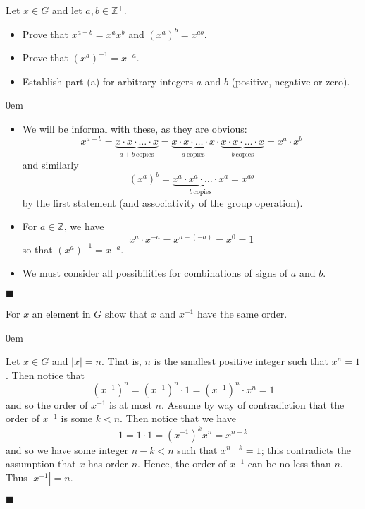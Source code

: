 \documentclass[12pt]{article}
\renewcommand{\qed}{\hfill$\blacksquare$}
\renewenvironment{proof}{\begin{addmargin}[1em]{0em}\begin{newproof}}{\end{newproof}\end{addmargin}\qed}
\newenvironment{problem}[2][Exercise]{\begin{trivlist}
\item[\hskip \labelsep {\bfseries #1}\hskip \labelsep {\bfseries #2.}]}{\end{trivlist}}
\begin{document}
\begin{problem}{1.1.19}
Let $x\in G$ and let $a,b\in \mathbb{Z}^+$.
\begin{itemize}
    \item Prove that $x^{a+b}=x^ax^b$ and $\left(x^a\right)^b = x^{ab}$.
    \item Prove that $\left(x^a\right)^{-1}=x^{-a}$.
    \item Establish part (a) for arbitrary integers $a$ and $b$ (positive, negative or zero).
\end{itemize}
\end{problem}
\begin{proof}
\begin{itemize}
    \item We will be informal with these, as they are obvious:
    $$ x^{a+b} = \underbrace{x\cdot x \cdot \ldots \cdot x}_{a+b \, \text{copies}} = \underbrace{x\cdot x\cdot \ldots \cdot x}_{a\, \text{copies}} \cdot \underbrace{x\cdot x\cdot \ldots \cdot x}_{b \, \text{copies}} = x^a \cdot x^b$$
    and similarly
    $$ \left(x^a\right)^b = \underbrace{x^a \cdot x^a \cdot \ldots \cdot x^a}_{b \, \text{copies}} = x^{ab}$$
    by the first statement (and associativity of the group operation).

    \item For $a\in \mathbb{Z}$, we have
    $$ x^a\cdot x^{-a} = x^{a+\left(-a\right)} = x^0 = 1 $$ so that $\left(x^a\right)^{-1} = x^{-a}$.

    \item We must consider all possibilities for combinations of signs of $a$ and $b$.

\end{itemize}
\end{proof}








\begin{problem}{1.1.20}
For $x$ an element in $G$ show that $x$ and $x^{-1}$ have the same order.
\end{problem}
\begin{proof}
Let $x\in G$ and $\left|x\right|=n$. That is, $n$ is the smallest positive integer such that $x^n=1$. Then notice that
$$ \left(x^{-1}\right)^n = \left(x^{-1}\right)^n \cdot 1 = \left(x^{-1}\right)^n \cdot x^n = 1 $$
and so the order of $x^{-1}$ is at most $n$. Assume by way of contradiction that the order of $x^{-1}$ is some $k < n$. Then notice that we have
$$ 1 = 1\cdot 1 = \left(x^{-1}\right)^{k} x^n = x^{n-k} $$
and so we have some integer $n-k < n$ such that $x^{n-k} = 1$; this contradicts the assumption that $x$ has order $n$. Hence, the order of $x^{-1}$ can be no less than $n$. Thus $\left|x^{-1}\right|=n$.
\end{proof}
\end{document}
